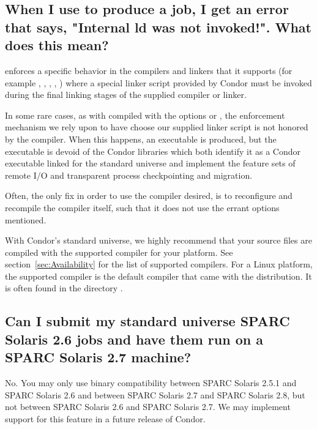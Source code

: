 \subsection*{When I use  to produce a job, I get an error that says, "Internal ld was not invoked!". What does this mean?}

 enforces a specific behavior in the compilers and
linkers that it supports
(for example , , , , )
where a special linker script
provided by Condor must be invoked during the final linking stages of
the supplied compiler or linker.

In some rare cases,
as with  compiled with
the options  or ,
the enforcement mechanism
we rely upon to have 
choose our supplied linker script is not honored
by the compiler.
When this happens, an executable is produced,
but the executable is devoid of the
Condor libraries which both identify it as a Condor executable linked
for the standard universe and implement the feature sets of remote I/O
and transparent process checkpointing and migration.

Often, the only fix in order to use the compiler desired,
is to reconfigure and recompile the compiler itself,
such that it does not use the errant options mentioned. 

With Condor's standard universe,
we highly recommend that your source files
are compiled with the supported compiler for your platform.
See
section~\ref{sec:Availability}
for the list of supported compilers.
For a Linux platform, the supported compiler
is the default compiler that came with the distribution.
It is often found in the directory .

\subsection*{Can I submit my standard universe SPARC Solaris 2.6 jobs and have them run on a SPARC Solaris 2.7 machine?}

No. You may only use binary compatibility between SPARC Solaris 2.5.1
and SPARC Solaris 2.6 and between SPARC Solaris 2.7 and SPARC Solaris
2.8, but not between SPARC Solaris 2.6 and SPARC Solaris 2.7.  We may
implement support for this feature in a future release of Condor.

